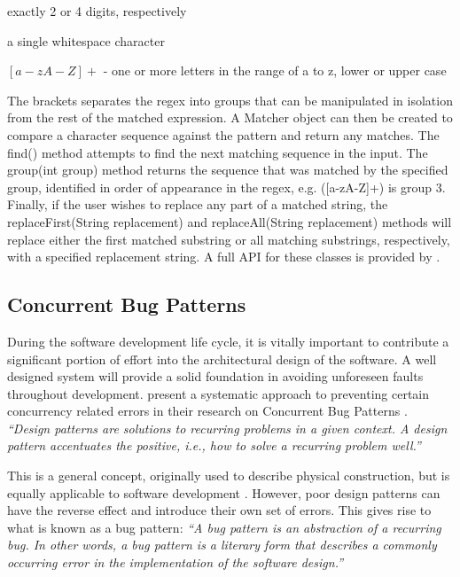\documentclass[a4paper,12pt]{article}
\begin{document}
\begin{description}
    \item[ $\setminus d\{2\}, \setminus d\{4\}$ -] exactly 2 or 4 digits, respectively
    \item[ $\setminus s $ -] a single whitespace character
    \item $[a-zA-Z]+$ - one or more letters in the range of a to z, lower or upper case
\end{description}

The brackets separates the regex into groups that can be manipulated in isolation from the rest of the matched expression. A Matcher object can then be created to compare a character sequence against the pattern and return any matches. The find() method attempts to find the next matching sequence in the input. The group(int group) method returns the sequence that was matched by the specified group, identified in order of appearance in the regex, e.g. ([a-zA-Z]+) is group 3. Finally, if the user wishes to replace any part of a matched string, the replaceFirst(String replacement) and replaceAll(String replacement) methods will replace either the first matched substring or all matching substrings, respectively, with a specified replacement string. A full API for these classes is provided by \citeauthor{regex_package19}.


\subsection{Concurrent Bug Patterns}

During the software development life cycle, it is vitally important to contribute a significant portion of effort into the architectural design of the software. A well designed system will provide a solid foundation in avoiding unforeseen faults throughout development. \citeauthor{farchi03} present a systematic approach to preventing certain concurrency related errors in their research on Concurrent Bug Patterns \citep{farchi03}. \textit{“Design patterns are solutions to recurring problems in a given context. A design pattern accentuates the positive, i.e., how to solve a recurring problem well.”} 

This is a general concept, originally used to describe physical construction, but is equally applicable to software development \citep{gamma15}. However, poor design patterns can have the reverse effect and introduce their own set of errors. This gives rise to what is known as a bug pattern: \textit{“A bug pattern is an abstraction of a recurring bug. In other words, a bug pattern is a literary form that describes a commonly occurring error in the implementation of the software design.”}
\end{document}
